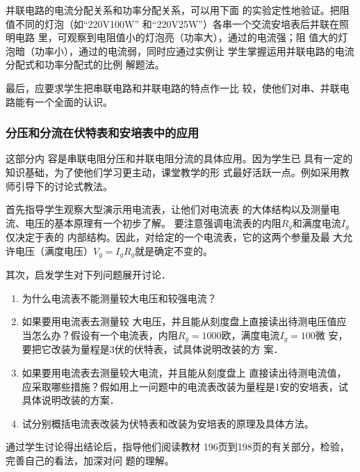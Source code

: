 并联电路的电流分配关系和功率分配关系，可以用下面
的实验定性地验证。把阻值不同的灯泡（如“220V100W”
和“220V25W”）各串一个交流安培表后并联在照明电路
里，可观察到电阻值小的灯泡亮（功率大），通过的电流强；阻
值大的灯泡暗（功率小），通过的电流弱，同时应通过实例让
学生掌握运用并联电路的电流分配式和功率分配式的比例
解题法。

最后，应要求学生把串联电路和并联电路的特点作一比
较，使他们对串、并联电路能有一个全面的认识。

\subsubsection{分压和分流在伏特表和安培表中的应用}

这部分内
容是串联电阻分压和并联电阻分流的具体应用。因为学生已
具有一定的知识基础，为了使他们学习更主动，课堂教学的形
式最好活跃一点。例如采用教师引导下的讨论式教法。

首先指导学生观察大型演示用电流表，让他们对电流表
的大体结构以及测量电流、电压的基本原理有一个初步了解。
要注意强调电流表的内阻$R_g$和满度电流$I_g$仅决定于表的
内部结构。因此，对给定的一个电流表，它的这两个参量及最
大允许电压（满度电压）$V_g=I_gR_g$就是确定不变的。

其次，启发学生对下列问题展开讨论．
\begin{enumerate}
    \item 为什么电流表不能测量较大电压和较强电流？
    \item 如果要用电流表去测量较
大电压，并且能从刻度盘上直接读出待测电压值应当怎么办？假设有一个电流表，内阻$R_g=1000$欧，满度电流$I_g=100$微
安，要把它改装为量程是3伏的伏特表，试具体说明改装的方
案．
\item 如果要用电流表去测量较大电流，并且能从刻度盘上
直接读出待测电流值，应采取哪些措施？假如用上一问题中的电流表改装为量程是1安的安培表，试具体说明改装的方案．
\item 试分别概括电流表改装为伏特表和改装为安培表的原理及具体方法。
\end{enumerate}
通过学生讨论得出结论后，指导他们阅读教材
196页到198页的有关部分，检验，完善自己的看法，加深对问
题的理解。

